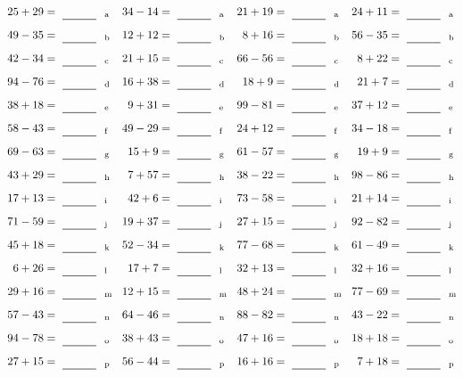 \documentclass
[
  draft    = true,
  fontsize = 11pt,
  parskip  = half-
]
{scrartcl}
\begin{document}
\clearpage
\begin{align*}
    \pline{25+29}&=\rline{a}
  & \pline{34-14}&=\rline{a}
  & \pline{21+19}&=\rline{a}
  & \pline{24+11}&=\rline{a} \\[1ex]
    \pline{49-35}&=\rline{b}
  & \pline{12+12}&=\rline{b}
  & \pline{8+16}&=\rline{b}
  & \pline{56-35}&=\rline{b} \\[1ex]
    \pline{42-34}&=\rline{c}
  & \pline{21+15}&=\rline{c}
  & \pline{66-56}&=\rline{c}
  & \pline{8+22}&=\rline{c} \\[1ex]
    \pline{94-76}&=\rline{d}
  & \pline{16+38}&=\rline{d}
  & \pline{18+9}&=\rline{d}
  & \pline{21+7}&=\rline{d} \\[1ex]
    \pline{38+18}&=\rline{e}
  & \pline{9+31}&=\rline{e}
  & \pline{99-81}&=\rline{e}
  & \pline{37+12}&=\rline{e} \\[1ex]
    \pline{58-43}&=\rline{f}
  & \pline{49-29}&=\rline{f}
  & \pline{24+12}&=\rline{f}
  & \pline{34-18}&=\rline{f} \\[1ex]
    \pline{69-63}&=\rline{g}
  & \pline{15+9}&=\rline{g}
  & \pline{61-57}&=\rline{g}
  & \pline{19+9}&=\rline{g} \\[1ex]
    \pline{43+29}&=\rline{h}
  & \pline{7+57}&=\rline{h}
  & \pline{38-22}&=\rline{h}
  & \pline{98-86}&=\rline{h} \\[1ex]
    \pline{17+13}&=\rline{i}
  & \pline{42+6}&=\rline{i}
  & \pline{73-58}&=\rline{i}
  & \pline{21+14}&=\rline{i} \\[1ex]
    \pline{71-59}&=\rline{j}
  & \pline{19+37}&=\rline{j}
  & \pline{27+15}&=\rline{j}
  & \pline{92-82}&=\rline{j} \\[1ex]
    \pline{45+18}&=\rline{k}
  & \pline{52-34}&=\rline{k}
  & \pline{77-68}&=\rline{k}
  & \pline{61-49}&=\rline{k} \\[1ex]
    \pline{6+26}&=\rline{l}
  & \pline{17+7}&=\rline{l}
  & \pline{32+13}&=\rline{l}
  & \pline{32+16}&=\rline{l} \\[1ex]
    \pline{29+16}&=\rline{m}
  & \pline{12+15}&=\rline{m}
  & \pline{48+24}&=\rline{m}
  & \pline{77-69}&=\rline{m} \\[1ex]
    \pline{57-43}&=\rline{n}
  & \pline{64-46}&=\rline{n}
  & \pline{88-82}&=\rline{n}
  & \pline{43-22}&=\rline{n} \\[1ex]
    \pline{94-78}&=\rline{o}
  & \pline{38+43}&=\rline{o}
  & \pline{47+16}&=\rline{o}
  & \pline{18+18}&=\rline{o} \\[1ex]
    \pline{27+15}&=\rline{p}
  & \pline{56-44}&=\rline{p}
  & \pline{16+16}&=\rline{p}
  & \pline{7+18}&=\rline{p}
\end{align*}
\end{document}
